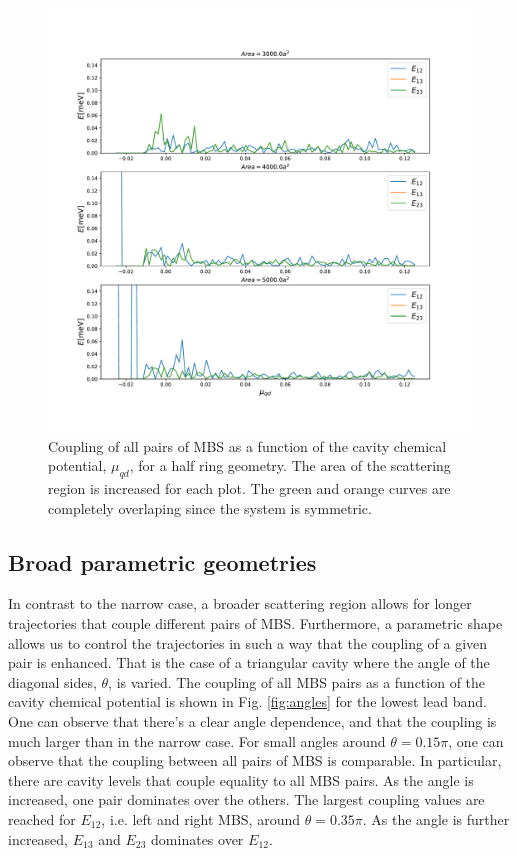\documentclass[10pt,twocolumn,aps,superscriptaddress, floatfix,notitlepage]{revtex4-1}
\begin{document}
\begin{figure}[h!]
  \centering
  \includegraphics[width=\linewidth]{figures/half_ring_coupling.pdf}
  \caption{Coupling of all pairs of MBS as a function of the cavity chemical potential, $\mu_{qd}$, for a half ring geometry. The area of the scattering region is increased for each plot. The green and orange curves are completely overlaping since the system is symmetric.}
  \label{fig:half_ring}
\end{figure}

\subsection{Broad parametric geometries}

In contrast to the narrow case, a broader scattering region allows for longer trajectories that couple different pairs of MBS. Furthermore, a parametric shape allows us to control the trajectories in such a way that the coupling of a given pair is enhanced. That is the case of a triangular cavity where the angle of the diagonal sides, $\theta$, is varied. The coupling of all MBS pairs as a function of the cavity chemical potential is shown in Fig. \ref{fig:angles} for the lowest lead band. One can observe that there's a clear angle dependence, and that the coupling is much larger than in the narrow case. For small angles around $\theta=0.15\pi$, one can observe that the coupling between all pairs of MBS is comparable. In particular, there are cavity levels that couple equality to all MBS pairs. As the angle is increased, one pair dominates over the others. The largest coupling values are reached for $E_{12}$, i.e. left and right MBS, around $\theta=0.35\pi$.  As the angle is further increased, $E_{13}$ and $E_{23}$ dominates over $E_{12}$.
\end{document}
